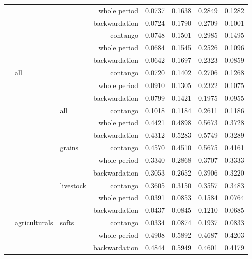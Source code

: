 \documentclass[]{elsarticle} %
\begin{document}
\begin{longtable}[t]{>{}lllrrrrr}
\endfoot
\bottomrule
\endlastfoot
 &  &  & whole period & 0.0737 & 0.1638 & 0.2849 & 0.1282\\
\nopagebreak
 &  &  & backwardation & 0.0724 & 0.1790 & 0.2709 & 0.1001\\
\nopagebreak
\multirow[t]{-3}{*}{\raggedright\arraybackslash \textbf{all}} &  &  & contango & 0.0748 & 0.1501 & 0.2985 & 0.1495\\
\nopagebreak
 &  &  & whole period & 0.0684 & 0.1545 & 0.2526 & 0.1096\\
\nopagebreak
 &  &  & backwardation & 0.0642 & 0.1697 & 0.2323 & 0.0859\\
\nopagebreak
 & \multirow[t]{-6}{*}{\raggedright\arraybackslash all} &  & contango & 0.0720 & 0.1402 & 0.2706 & 0.1268\\
\nopagebreak
 &  &  & whole period & 0.0910 & 0.1305 & 0.2322 & 0.1075\\
\nopagebreak
 &  &  & backwardation & 0.0799 & 0.1421 & 0.1975 & 0.0955\\
\nopagebreak
 &  & \multirow[t]{-9}{*}{\raggedright\arraybackslash all} & contango & 0.1018 & 0.1184 & 0.2611 & 0.1186\\
\nopagebreak
 &  &  & whole period & 0.4421 & 0.4898 & 0.5673 & 0.3728\\
\nopagebreak
 &  &  & backwardation & 0.4312 & 0.5283 & 0.5749 & 0.3289\\
\nopagebreak
 &  & \multirow[t]{-3}{*}{\raggedright\arraybackslash grains} & contango & 0.4570 & 0.4510 & 0.5675 & 0.4161\\
\nopagebreak
 &  &  & whole period & 0.3340 & 0.2868 & 0.3707 & 0.3333\\
\nopagebreak
 &  &  & backwardation & 0.3053 & 0.2652 & 0.3906 & 0.3220\\
\nopagebreak
 &  & \multirow[t]{-3}{*}{\raggedright\arraybackslash livestock} & contango & 0.3605 & 0.3150 & 0.3557 & 0.3483\\
\nopagebreak
 &  &  & whole period & 0.0391 & 0.0853 & 0.1584 & 0.0764\\
\nopagebreak
 &  &  & backwardation & 0.0437 & 0.0845 & 0.1210 & 0.0685\\
\nopagebreak
 & \multirow[t]{-12}{*}{\raggedright\arraybackslash agriculturals} & \multirow[t]{-3}{*}{\raggedright\arraybackslash softs} & contango & 0.0334 & 0.0874 & 0.1937 & 0.0833\\
\nopagebreak
 &  &  & whole period & 0.4908 & 0.5892 & 0.4687 & 0.4203\\
\nopagebreak
 &  &  & backwardation & 0.4844 & 0.5949 & 0.4601 & 0.4179\\

\end{longtable}
\end{document}
